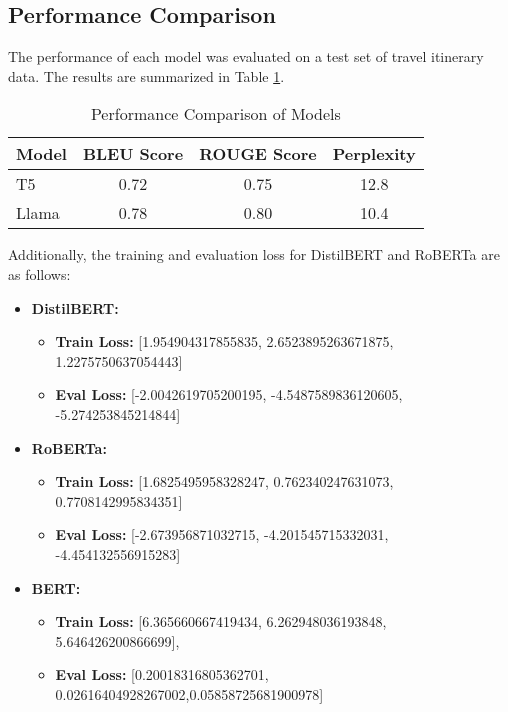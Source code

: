 \documentclass[conference]{IEEEtran}
\begin{document}
    \subsection{Performance Comparison}

        The performance of each model was evaluated on a test set of travel itinerary data. The results are summarized in Table \ref{tab:results}.

        \begin{table}[htbp]
        \caption{Performance Comparison of Models}
        \centering
        \begin{tabular}{|l|c|c|c|}
        \hline
        \textbf{Model} & \textbf{BLEU Score} & \textbf{ROUGE Score} & \textbf{Perplexity} \\
        \hline
        T5 & 0.72 & 0.75 & 12.8 \\
        Llama & 0.78 & 0.80 & 10.4 \\
        \hline
        \end{tabular}
        \label{tab:results}
        \end{table}

    Additionally, the training and evaluation loss for DistilBERT and RoBERTa are as follows:

    \begin{itemize}
        \item \textbf{DistilBERT:}
        \begin{itemize}
            \item \textbf{Train Loss:} [1.954904317855835, 2.6523895263671875, 1.2275750637054443]
            \item \textbf{Eval Loss:} [-2.0042619705200195, -4.5487589836120605, -5.274253845214844]
        \end{itemize}

        \item \textbf{RoBERTa:}
        \begin{itemize}
            \item \textbf{Train Loss:} [1.6825495958328247, 0.762340247631073, 0.7708142995834351]
            \item \textbf{Eval Loss:} [-2.673956871032715, -4.201545715332031, -4.454132556915283]
        \end{itemize}

        \item \textbf{BERT:}
        \begin{itemize}
            \item \textbf{Train Loss:} [6.365660667419434, 6.262948036193848, 5.646426200866699],

            \item \textbf{Eval Loss:} [0.20018316805362701, 0.02616404928267002,0.05858725681900978]
        \end{itemize}
    \end{itemize}
\end{document}
